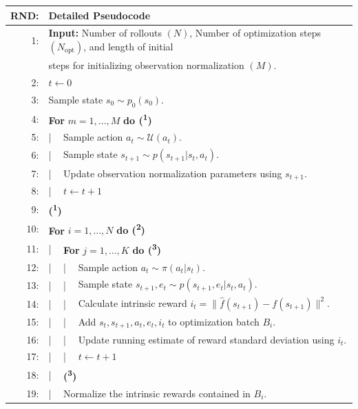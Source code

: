 \begin{table}[H]
  \centering
  \begin{tabular}{rlll}
    \hline\hline
    \textbf{RND:} & \multicolumn{3}{l}{Detailed Pseudocode}\\
    \hline
    1: & \multicolumn{3}{l}{\textbf{Input:} Number of rollouts $(N)$, Number of optimization steps $(N_{\text{opt}})$, and length of initial}\\
    & \multicolumn{3}{l}{steps for initializing observation normalization $(M)$.}\\
    2: & \multicolumn{3}{l}{$t \leftarrow 0$}\\
    3: & \multicolumn{3}{l}{Sample state $s_{0} \sim p_{0}(s_{0})$.}\\
    4: & \multicolumn{3}{l}{\textbf{For} $m = 1, ..., M$ \textbf{do (\textsuperscript{1})}}\\
    5: & | & \multicolumn{2}{l}{Sample action $a_{t} \sim \mathcal{U}(a_{t})$.}\\
    6: & | & \multicolumn{2}{l}{Sample state $s_{t+1} \sim p(s_{t+1}|s_{t}, a_{t})$.}\\
    7: & | & \multicolumn{2}{l}{Update observation normalization parameters using $s_{t+1}$.}\\
    8: & | & \multicolumn{2}{l}{$t \leftarrow t + 1$}\\
    9: & \multicolumn{3}{l}{\textbf{(\textsuperscript{1})}}\\
    10: & \multicolumn{3}{l}{\textbf{For} $i = 1, ..., N$ \textbf{do (\textsuperscript{2})}}\\
    11: & | & \multicolumn{2}{l}{\textbf{For} $j = 1, ..., K$ \textbf{do (\textsuperscript{3})}}\\
    12: & | & | & Sample action $a_{t} \sim \pi(a_{t}|s_{t})$.\\
    13: & | & | & Sample state $s_{t+1}, e_{t} \sim p(s_{t+1}, e_{t}|s_{t}, a_{t})$.\\
    14: & | & | & Calculate intrinsic reward $i_{t} = \|\hat{f}(s_{t+1}) - f(s_{t+1})\|^{2}$.\\
    15: & | & | & Add $s_{t}, s_{t+1}, a_{t}, e_{t}, i_{t}$ to optimization batch $B_{i}$.\\
    16: & | & | & Update running estimate of reward standard deviation using $i_{t}$.\\
    17: & | & | & $t \leftarrow t + 1$\\
    18: & | & \multicolumn{2}{l}{\textbf{(\textsuperscript{3})}}\\
    19: & | & \multicolumn{2}{l}{Normalize the intrinsic rewards contained in $B_{i}$.}\\

\end{tabular}
\end{table}
